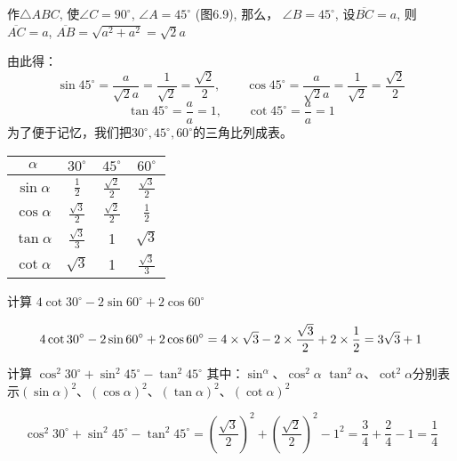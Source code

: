 作$\triangle ABC$, 使$\angle C=90^{\circ}$, $\angle A=45^{\circ}$ (图6.9), 那么，
$\angle B=45^{\circ}$, 设$\overline{BC}=a$, 则$\overline{AC}=a$, $\overline{AB}=\sqrt{a^2+a^2}=\sqrt{2}a$

由此得：
\[\sin 45^{\circ}=\frac{a}{\sqrt{2}a}=\frac{1}{\sqrt{2}}=\frac{\sqrt{2}}{2},\qquad \cos 45^{\circ}=\frac{a}{\sqrt{2}a}=\frac{1}{\sqrt{2}}=\frac{\sqrt{2}}{2}\]
\[\tan 45^{\circ}=\frac{a}{a}=1,\qquad \cot 45^{\circ}=\frac{a}{a}=1\]
为了便于记忆，我们把$30^{\circ},45^{\circ},60^{\circ}$的三角比列成表。
\begin{center}
    \begin{tabular}{c|ccc}
        \hline
$\alpha$&$30^{\circ}$&$45^{\circ}$&$60^{\circ}$\\
\hline
$\sin\alpha$  &  $\frac{1}{2}$ & $\frac{\sqrt{2}}{2}$& $\frac{\sqrt{3}}{2}$\\
$\cos\alpha$  &  $\frac{\sqrt{3}}{2}$ & $\frac{\sqrt{2}}{2}$& $\frac{1}{2}$\\
$\tan\alpha$  &  $\frac{\sqrt{3}}{3}$ &1&$\sqrt{3}$\\
$\cot\alpha$  &  $\sqrt{3}$ &1&$\frac{\sqrt{3}}{3}$\\
\hline
    \end{tabular}
\end{center}

\begin{example}
    计算 $4\cot 30^{\circ}-2\sin60^{\circ}+2\cos60^{\circ}$
\end{example}

\begin{solution}
\[4\cot 30^{\circ}-2\sin60^{\circ}+2\cos60^{\circ} =4\times \sqrt{3}-2\times \dfrac{\sqrt{3}}{2}+2\times \dfrac{1}{2}=3\sqrt{3}+1
\]
\end{solution}


\begin{example}
    计算
$\cos^2 30^{\circ}+\sin^2 45^{\circ}-\tan^2 45^{\circ}$
其中：$\sin^\alpha$、$\cos^2\alpha$
$\tan^2\alpha$、$\cot^2\alpha$分别表示$(\sin\alpha)^2$、$(\cos \alpha)^2$、$(\tan\alpha)^2$、$(\cot \alpha)^2$
\end{example}


\begin{solution}
\[\cos^2 30^{\circ}+\sin^2 45^{\circ}-\tan^2 45^{\circ}=\left(\frac{\sqrt{3}}{2}\right)^2+\left(\frac{\sqrt{2}}{2}\right)^2-1^2=\frac{3}{4}+\frac{2}{4}-1=\frac{1}{4}\]
\end{solution}

